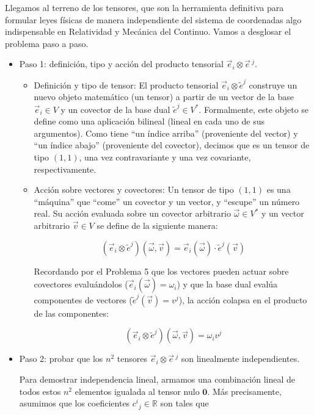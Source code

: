\documentclass[11pt,spanish]{article}
\newcommand{\svec}[1]{\vec{#1}{\,}\mbox{}}
\newcommand{\RR}{\mathbb{R}}
\newcounter{problema}
\begin{document}
Llegamos al terreno de los tensores, que son la herramienta definitiva para formular leyes físicas de manera independiente del sistema de coordenadas algo indispensable en Relatividad y Mecánica del Continuo.
Vamos a desglosar el problema paso a paso.

\begin{itemize}
\item Paso 1: definición, tipo y acción del producto tensorial $\vec{e}_i \otimes \svec{e}^j$.

\begin{itemize}
\item Definición y tipo de tensor:
El producto tensorial $\vec{e}_i \otimes \tilde{e}^j$ construye un nuevo objeto matemático (un tensor) a partir de un vector de la base $\vec{e}_i \in V$ y un covector de la base dual $\tilde{e}^j \in V^*$.
Formalmente, este objeto se define como una aplicación bilineal (lineal en cada uno de sus argumentos). 
Como tiene ``un índice arriba'' (proveniente del vector) y ``un índice abajo'' (proveniente del covector), decimos que es un tensor de tipo $(1,1)$, una vez contravariante y una vez covariante, respectivamente.

\item Acción sobre vectores y covectores:
Un tensor de tipo $(1,1)$ es una ``máquina'' que ``come'' un covector y un vector, y ``escupe'' un número real. Su acción evaluada sobre un covector arbitrario $\vec{\omega} \in V^*$ y un vector arbitrario $\vec{v} \in V$ se define de la siguiente manera:

$$(\vec{e}_i \otimes \tilde{e}^j)(\vec{\omega}, \vec{v}) = \vec{e}_i(\vec{\omega}) \cdot \tilde{e}^j(\vec{v})$$

Recordando por el Problema 5 que los vectores pueden actuar sobre covectores evaluándolos ($\vec{e}_i(\vec{\omega}) = \omega_i$) y que la base dual evalúa componentes de vectores ($\tilde{e}^j(\vec{v}) = v^j$), la acción colapsa en el producto de las componentes:

$$(\vec{e}_i \otimes \tilde{e}^j)(\vec{\omega}, \vec{v}) = \omega_i v^j$$

\end{itemize}

\item Paso 2: probar que los $n^2$ tensores $\vec{e}_i \otimes \svec{e}^j$ son linealmente independientes.

Para demostrar independencia lineal, armamos una combinación lineal de todos estos $n^2$ elementos igualada al tensor nulo $\mathbf{0}$. 
M\'as precisamente, asumimos que los coeficientes $c^i{}_j\in \RR$ son tales que


\end{itemize}
\end{document}
